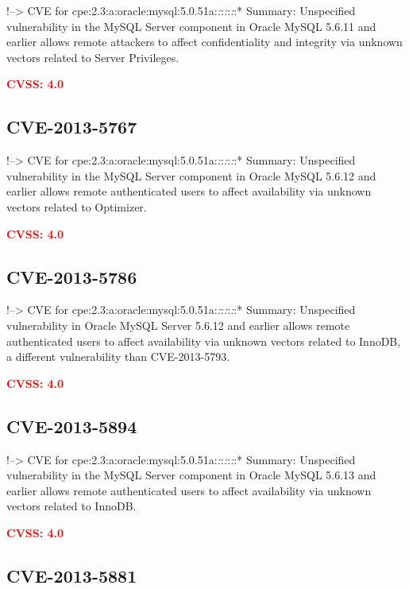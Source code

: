 \documentclass[a4paper, 12pt]{article}
\begin{document}
!--\textgreater{} CVE for
cpe:2.3:a:oracle:mysql:5.0.51a:\emph{:}:\emph{:}:\emph{:}:* Summary:
Unspecified vulnerability in the MySQL Server component in Oracle MySQL
5.6.11 and earlier allows remote attackers to affect confidentiality and
integrity via unknown vectors related to Server Privileges.

\textbf{\textcolor{red}{CVSS: 4.0}}

\hypertarget{cve-2013-5767}{%
\subsection{CVE-2013-5767}\label{cve-2013-5767}}

!--\textgreater{} CVE for
cpe:2.3:a:oracle:mysql:5.0.51a:\emph{:}:\emph{:}:\emph{:}:* Summary:
Unspecified vulnerability in the MySQL Server component in Oracle MySQL
5.6.12 and earlier allows remote authenticated users to affect
availability via unknown vectors related to Optimizer.

\textbf{\textcolor{red}{CVSS: 4.0}}

\hypertarget{cve-2013-5786}{%
\subsection{CVE-2013-5786}\label{cve-2013-5786}}

!--\textgreater{} CVE for
cpe:2.3:a:oracle:mysql:5.0.51a:\emph{:}:\emph{:}:\emph{:}:* Summary:
Unspecified vulnerability in Oracle MySQL Server 5.6.12 and earlier
allows remote authenticated users to affect availability via unknown
vectors related to InnoDB, a different vulnerability than CVE-2013-5793.

\textbf{\textcolor{red}{CVSS: 4.0}}

\hypertarget{cve-2013-5894}{%
\subsection{CVE-2013-5894}\label{cve-2013-5894}}

!--\textgreater{} CVE for
cpe:2.3:a:oracle:mysql:5.0.51a:\emph{:}:\emph{:}:\emph{:}:* Summary:
Unspecified vulnerability in the MySQL Server component in Oracle MySQL
5.6.13 and earlier allows remote authenticated users to affect
availability via unknown vectors related to InnoDB.

\textbf{\textcolor{red}{CVSS: 4.0}}

\hypertarget{cve-2013-5881}{%
\subsection{CVE-2013-5881}\label{cve-2013-5881}}
\end{document}
